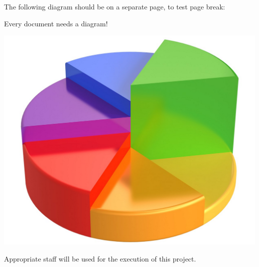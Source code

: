 {The following diagram should be on a separate page, to test page break:

\pagebreak


Every document needs a diagram!

\includegraphics{SHbO80B3zYiLwN09wcE1jxTyLWaBsr7llKXblVz0EwCQsT2EsGznwPa4YwxgN3BwyMSEZhyazyYEoA5TNEBswNe6FJ2ZZsw9_E5R3YnzdCYFfcxjoR-rnHg.jpg}

\pagebreak



Appropriate staff will be used for the execution of this project.


}
